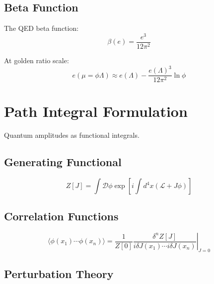 \subsection{Beta Function}

\begin{proposition}
\label{prop:beta-golden}
The QED beta function:
\begin{equation}
\beta(e) = \frac{e^3}{12\pi^2}
\end{equation}

At golden ratio scale:
\begin{equation}
e(\mu = \phi \Lambda) \approx e(\Lambda) - \frac{e(\Lambda)^3}{12\pi^2}\ln\phi
\end{equation}
\end{proposition}

\section{Path Integral Formulation}

Quantum amplitudes as functional integrals.

\subsection{Generating Functional}

\begin{definition}
\label{def:path-integral}
\begin{equation}
Z[J] = \int \mathcal{D}\phi \exp\left[i\int d^4x(\mathcal{L} + J\phi)\right]
\end{equation}
\end{definition}

\subsection{Correlation Functions}

\begin{theorem}
\label{thm:n-point}
\begin{equation}
\langle\phi(x_1)\cdots\phi(x_n)\rangle = \frac{1}{Z[0]}\left.\frac{\delta^n Z[J]}{i\delta J(x_1)\cdots i\delta J(x_n)}\right|_{J=0}
\end{equation}
\end{theorem}

\subsection{Perturbation Theory}

